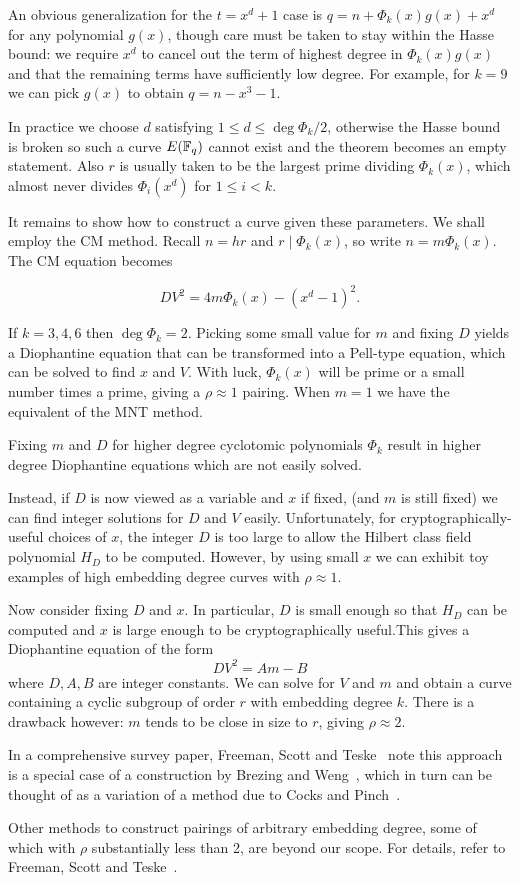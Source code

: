 An obvious generalization for the $t = x^d + 1$ case is
$q = n + \Phi_k(x)g(x) + x^d$ for any polynomial $g(x)$, though care must
be taken to stay within the Hasse bound: we require $x^d$ to cancel out the
term of highest degree in $\Phi_k(x)g(x)$ and that the remaining terms have
sufficiently low degree. For example, for $k=9$ we can pick $g(x)$ to obtain
$q = n - x^3 - 1$.

In practice we choose $d$ satisfying $1 \le d \le \deg \Phi_k /2$,
otherwise the Hasse bound is broken so such a curve $E(\mathbb{F}_q)$ cannot exist and
the theorem becomes an empty statement.
Also $r$ is usually taken to be the largest prime dividing $\Phi_k(x)$,
which almost never divides $\Phi_i(x^d)$ for $1 \le i < k$.

It remains to show how to construct a curve given these parameters. We shall
employ the CM method. Recall $n = hr$ and $r \mid \Phi_k(x)$, so write
$n = m \Phi_k(x)$. The CM equation becomes

\[ D V^2 = 4m\Phi_k(x)-(x^d-1)^2 . \]

If $k=3,4,6$ then $\deg \Phi_k = 2$. Picking some small value for $m$
and fixing $D$ yields
a Diophantine equation that can be transformed into a Pell-type equation,
which can be solved to find $x$ and $V$. With luck, $\Phi_k(x)$ will be
prime or a small number times a prime, giving a $\rho \approx 1$ pairing.
When $m=1$ we have the equivalent of the MNT method.

Fixing $m$ and $D$ for higher degree cyclotomic polynomials
$\Phi_k$ result in higher degree Diophantine equations which are not easily
solved.

Instead, if $D$ is now viewed as a variable and $x$ if fixed,
(and $m$ is still fixed) we can find integer solutions for $D$ and $V$
easily. Unfortunately, for cryptographically-useful choices of $x$,
the integer $D$ is too large to allow the Hilbert class field polynomial $H_D$
to be computed.
However, by using small $x$ we can exhibit toy examples of high
embedding degree curves with $\rho \approx 1$.

Now consider fixing $D$ and $x$. In particular, $D$ is small enough so
that $H_D$ can be computed and $x$ is large enough to be cryptographically
useful.This gives a Diophantine
equation of the form
\[ D V^2 = Am - B \]
where $D, A, B$ are integer constants. We can solve for $V$ and $m$ and
obtain a curve containing a cyclic subgroup of order $r$
with embedding degree $k$. There is a drawback however: $m$ tends to be close
in size to $r$, giving $\rho \approx 2$.

In a comprehensive survey paper,
Freeman, Scott and Teske~\cite{fst} note this approach is a special case of a
construction by Brezing and Weng~\cite{bw}, which in turn can be thought of as a
variation of a method due to Cocks and Pinch~\cite{cp}.

Other methods to construct pairings of arbitrary embedding degree,
some of which with $\rho$ substantially less than 2, are beyond our scope.
For details, refer to Freeman, Scott and Teske~\cite{fst}.
